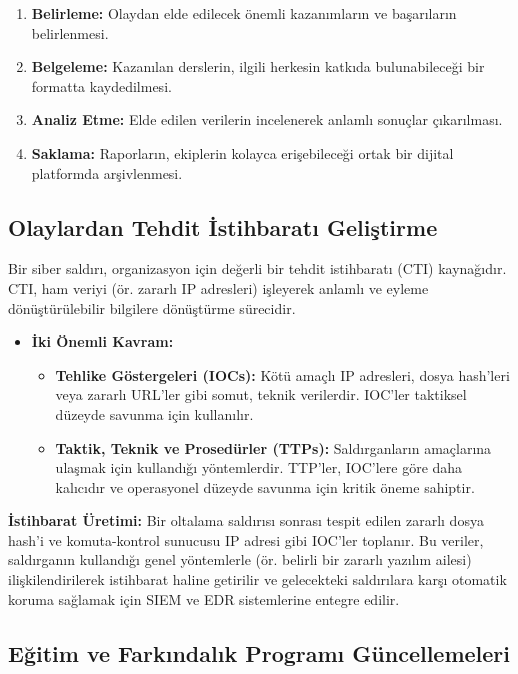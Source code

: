 \begin{itemize}
\begin{itemize}
\begin{enumerate}
    \item \textbf{Belirleme:} Olaydan elde edilecek önemli kazanımların ve başarıların belirlenmesi.
    \item \textbf{Belgeleme:} Kazanılan derslerin, ilgili herkesin katkıda bulunabileceği bir formatta kaydedilmesi.
    \item \textbf{Analiz Etme:} Elde edilen verilerin incelenerek anlamlı sonuçlar çıkarılması.
    \item \textbf{Saklama:} Raporların, ekiplerin kolayca erişebileceği ortak bir dijital platformda arşivlenmesi.
\end{enumerate}

\subsection{Olaylardan Tehdit İstihbaratı Geliştirme}

Bir siber saldırı, organizasyon için değerli bir tehdit istihbaratı (CTI) kaynağıdır. CTI, ham veriyi (ör. zararlı IP adresleri) işleyerek anlamlı ve eyleme dönüştürülebilir bilgilere dönüştürme sürecidir.

\begin{itemize}
    \item \textbf{İki Önemli Kavram:}
    \begin{itemize}
        \item \textbf{Tehlike Göstergeleri (IOCs):} Kötü amaçlı IP adresleri, dosya hash'leri veya zararlı URL'ler gibi somut, teknik verilerdir. IOC'ler taktiksel düzeyde savunma için kullanılır.
        \item \textbf{Taktik, Teknik ve Prosedürler (TTPs):} Saldırganların amaçlarına ulaşmak için kullandığı yöntemlerdir. TTP'ler, IOC'lere göre daha kalıcıdır ve operasyonel düzeyde savunma için kritik öneme sahiptir.
    \end{itemize}
\end{itemize}
\textbf{İstihbarat Üretimi:}
Bir oltalama saldırısı sonrası tespit edilen zararlı dosya hash'i ve komuta-kontrol sunucusu IP adresi gibi IOC'ler toplanır. Bu veriler, saldırganın kullandığı genel yöntemlerle (ör. belirli bir zararlı yazılım ailesi) ilişkilendirilerek istihbarat haline getirilir ve gelecekteki saldırılara karşı otomatik koruma sağlamak için SIEM ve EDR sistemlerine entegre edilir.

\subsection{Eğitim ve Farkındalık Programı Güncellemeleri}


\end{itemize}
\end{itemize}
